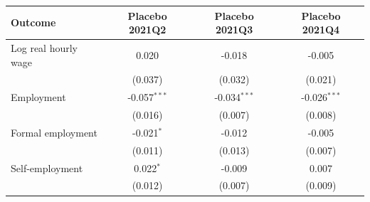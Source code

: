 \begin{tabular}{lccc}
\toprule
Outcome & Placebo 2021Q2 & Placebo 2021Q3 & Placebo 2021Q4 \\
\midrule
Log real hourly wage & 0.020 & -0.018 & -0.005 \\
 & (0.037) & (0.032) & (0.021) \\
Employment & -0.057$^{***}$ & -0.034$^{***}$ & -0.026$^{***}$ \\
 & (0.016) & (0.007) & (0.008) \\
Formal employment & -0.021$^{*}$ & -0.012 & -0.005 \\
 & (0.011) & (0.013) & (0.007) \\
Self-employment & 0.022$^{*}$ & -0.009 & 0.007 \\
 & (0.012) & (0.007) & (0.009) \\
\bottomrule
\end{tabular}
